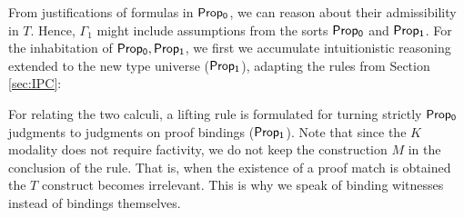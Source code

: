 \documentclass[11pt]{eptcs} %
\newcommand{\TurnTT}[2]
	{ \Delta_0;{#1}\vdash_{\sf JC_1}  {#2}}
\newcommand{\Turnj}[1]
	{ \Delta_0\vdash_{\sf J_0}  {#1}}
\begin{document}
%
From justifications of formulas in ${\sf Prop_0}$, we can reason  about their admissibility in $T$. Hence, $\Gamma_1$ might include assumptions from the sorts ${\sf Prop_0}$ and ${\sf Prop_1}$. For the inhabitation of ${\sf Prop_0, Prop_1}$, we first we accumulate intuitionistic reasoning extended to the new type universe (${\sf Prop_1}$), adapting the rules from Section \ref{sec:IPC}:
%
For relating the two calculi, a lifting rule is formulated for turning strictly ${\sf Prop_0}$ judgments to judgments on proof bindings (${\sf Prop_1}$). Note that since the $K$ modality does not require factivity, we do not keep the construction $M$ in the conclusion of the rule. That is, when the existence of a proof match is obtained  the $T$ construct becomes irrelevant. This is why we speak  of binding witnesses instead of bindings themselves. 
\end{document}
